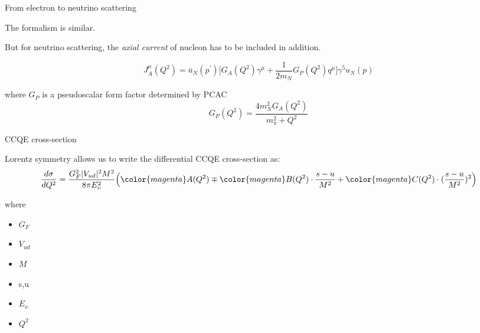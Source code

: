 %
%
%

\begin{frame}{From electron to neutrino scattering}

The formalism is similar.

But for neutrino scattering, the {\em axial current} of nucleon has to be included in addition.

\begin{equation*}
   J^{\mu}_{A}(Q^2) = \bar{u}_{N}(p^{\prime}) \Big[
       G_{A}(Q^2) \gamma^{\mu} +
       \frac{1}{2m_{N}} G_{P}(Q^2) q^{\mu}
      \Big] \gamma^{5} u_{N}(p)
\end{equation*}

where $G_{P}$ is a pseudoscalar form factor determined by PCAC
\begin{equation*}
 G_{P}(Q^2) = \frac{4m_{N}^{2} G_A(Q^2)}{m_{\pi}^{2}+Q^{2}}
\end{equation*}

\end{frame}


%
%
%

\begin{frame}{CCQE cross-section}

Lorentz symmetry allows us to write the differential CCQE cross-section as:\\

\begin{equation*}
  \frac{d\sigma}{dQ^2} =
     \frac{G_F^2 |V_{ud}|^2 M^2}{8 \pi E_{\nu}^2}
     \Big(
       {\color{magenta} A(Q^2) } \mp
       {\color{magenta} B(Q^2) } \cdot \frac{s-u}{M^2} +
       {\color{magenta} C(Q^2) } \cdot (\frac{s-u}{M^2})^2
     \Big)
\end{equation*}

where
\begin{itemize}
 \item $G_{F}$
 \item $V_{ud}$
 \item $M$
 \item s,u
 \item $E_{\nu}$
 \item $Q^{2}$
\end{itemize}

\end{frame}


%
%
%

